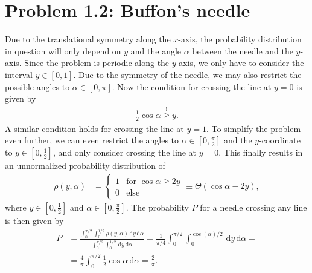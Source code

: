 \documentclass[english, parskip=full]{scrartcl}
\title{\titel}
\author{\autor}
\date{\today}
\newcommand{\kla}{}
\newcommand{\tecxt}{}
\begin{document}
\maketitle  %

\section*{Problem 1.2: Buffon's needle}
Due to the translational symmetry along the $x$-axis, the probability distribution in question will only depend on $y$ and the angle $\alpha$ between the needle and the $y$-axis. 
Since the problem is periodic along the $y$-axis, we only have to consider the interval $y\in\left[ 0,1 \right]$.
Due to the symmetry of the needle, we may also restrict the possible angles to $\alpha\in\left[ 0,\pi \right]$.
Now the condition for crossing the line at $y=0$ is given by
\begin{align}
\frac{1}{2}\cos\alpha\overset{!}{\ge}y.
\end{align}
A similar condition holds for crossing the line at $y=1$.
To simplify the problem even further, we can even restrict the angles to $\alpha\in\left[ 0,\frac{\pi}{2} \right]$ and the $y$-coordinate to $y\in\left[ 0,\frac{1}{2} \right]$, and only consider crossing the line at $y=0$.
This finally results in an unnormalized probability distribution of
\begin{align}
\rho(y,\alpha)&=\begin{cases} 1 &\tecxt\text{for }\cos\alpha\ge 2y \\ 0 &\tecxt\text{else} \end{cases}\equiv\Theta\kla\left( \cos\alpha - 2y \right),
\end{align}
where $y\in\left[ 0,\frac{1}{2} \right]$ and $\alpha\in\left[ 0,\frac{\pi}{2} \right]$.
The probability $P$ for a needle crossing any line is then given by
\begin{align}
P&=\frac{\int_{0}^{\pi/2}\int_{0}^{1/2}\rho(y,\alpha)\, \mathrm{d}y\, \mathrm{d}\alpha}{\int_{0}^{\pi/2}\int_{0}^{1/2}\, \mathrm{d}y\, \mathrm{d}\alpha}=\frac{1}{\pi/4}\int_{0}^{\pi/2}\int_{0}^{\cos(\alpha)/2}\, \mathrm{d}y\, \mathrm{d}\alpha=\\
&=\frac{4}{\pi}\int_{0}^{\pi/2}\frac{1}{2}\cos\alpha\, \mathrm{d}\alpha=\frac{2}{\pi}.
\end{align}
%
\end{document}
